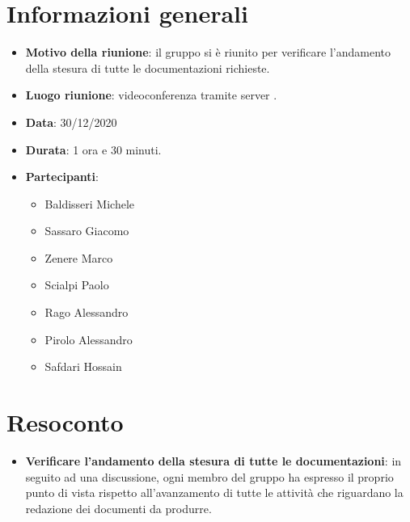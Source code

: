\section{Informazioni generali}
\begin{itemize}
\item \textbf{Motivo della riunione}: il gruppo si è riunito per verificare l'andamento della stesura di tutte le documentazioni richieste.
\item \textbf{Luogo riunione}: videoconferenza tramite server .
\item \textbf{Data}: 30/12/2020
\item \textbf{Durata}: 1 ora e 30 minuti.
\item \textbf{Partecipanti}:
	\begin{itemize}
	\item Baldisseri Michele
	\item Sassaro Giacomo
	\item Zenere Marco
	\item Scialpi Paolo
	\item Rago Alessandro
	\item Pirolo Alessandro
	\item Safdari Hossain
	\end{itemize}
\end{itemize}
\newpage
\section{Resoconto}
\begin{itemize}
\item \textbf{Verificare l'andamento della stesura di tutte le documentazioni}: in seguito ad una discussione, ogni membro del gruppo ha espresso il proprio punto di vista rispetto all'avanzamento di tutte le attività che riguardano la redazione dei documenti da produrre.
\end{itemize}